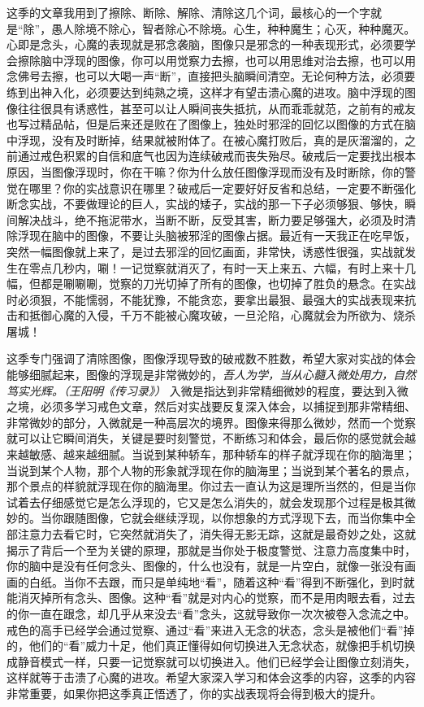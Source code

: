这季的文章我用到了擦除、断除、解除、清除这几个词，最核心的一个字就是“除”，愚人除境不除心，智者除心不除境。心生，种种魔生；心灭，种种魔灭。心即是念头，心魔的表现就是邪念袭脑，图像只是邪念的一种表现形式，必须要学会擦除脑中浮现的图像，你可以用觉察力去擦，也可以用思维对治去擦，也可以用念佛号去擦，也可以大喝一声“断”，直接把头脑瞬间清空。无论何种方法，必须要练到出神入化，必须要达到纯熟之境，这样才有望击溃心魔的进攻。脑中浮现的图像往往很具有诱惑性，甚至可以让人瞬间丧失抵抗，从而乖乖就范，之前有的戒友也写过精品帖，但是后来还是败在了图像上，独处时邪淫的回忆以图像的方式在脑中浮现，没有及时断掉，结果就被附体了。在被心魔打败后，真的是灰溜溜的，之前通过戒色积累的自信和底气也因为连续破戒而丧失殆尽。破戒后一定要找出根本原因，当图像浮现时，你在干嘛？你为什么放任图像浮现而没有及时断除，你的警觉在哪里？你的实战意识在哪里？破戒后一定要好好反省和总结，一定要不断强化断念实战，不要做理论的巨人，实战的矮子，实战的那一下子必须够狠、够快，瞬间解决战斗，绝不拖泥带水，当断不断，反受其害，断力要足够强大，必须及时清除浮现在脑中的图像，不要让头脑被邪淫的图像占据。最近有一天我正在吃早饭，突然一幅图像就上来了，是过去邪淫的回忆画面，非常快，诱惑性很强，实战就发生在零点几秒内，唰！一记觉察就消灭了，有时一天上来五、六幅，有时上来十几幅，但都是唰唰唰，觉察的刀光切掉了所有的图像，也切掉了胜负的悬念。在实战时必须狠，不能懦弱，不能犹豫，不能贪恋，要拿出最狠、最强大的实战表现来抗击和抵御心魔的入侵，千万不能被心魔攻破，一旦沦陷，心魔就会为所欲为、烧杀屠城！

这季专门强调了清除图像，图像浮现导致的破戒数不胜数，希望大家对实战的体会能够细腻起来，图像的浮现是非常微妙的，\textit{吾人为学，当从心髓入微处用力，自然笃实光辉。（王阳明《传习录》）} 入微是指达到非常精细微妙的程度，要达到入微之境，必须多学习戒色文章，然后对实战要反复深入体会，以捕捉到那非常精细、非常微妙的部分，入微就是一种高层次的境界。图像来得那么微妙，然而一个觉察就可以让它瞬间消失，关键是要时刻警觉，不断练习和体会，最后你的感觉就会越来越敏感、越来越细腻。当说到某种轿车，那种轿车的样子就浮现在你的脑海里；当说到某个人物，那个人物的形象就浮现在你的脑海里；当说到某个著名的景点，那个景点的样貌就浮现在你的脑海里。你过去一直认为这是理所当然的，但是当你试着去仔细感觉它是怎么浮现的，它又是怎么消失的，就会发现那个过程是极其微妙的。当你跟随图像，它就会继续浮现，以你想象的方式浮现下去，而当你集中全部注意力去看它时，它突然就消失了，消失得无影无踪，这就是最奇妙之处，这就揭示了背后一个至为关键的原理，那就是当你处于极度警觉、注意力高度集中时，你的脑中是没有任何念头、图像的，什么也没有，就是一片空白，就像一张没有画画的白纸。当你不去跟，而只是单纯地“看”，随着这种“看”得到不断强化，到时就能消灭掉所有念头、图像。这种“看”就是对内心的觉察，而不是用肉眼去看，过去的你一直在跟念，却几乎从来没去“看”念头，这就导致你一次次被卷入念流之中。戒色的高手已经学会通过觉察、通过“看”来进入无念的状态，念头是被他们“看”掉的，他们的“看”威力十足，他们真正懂得如何切换进入无念状态，就像把手机切换成静音模式一样，只要一记觉察就可以切换进入。他们已经学会让图像立刻消失，这样就等于击溃了心魔的进攻。希望大家深入学习和体会这季的内容，这季的内容非常重要，如果你把这季真正悟透了，你的实战表现将会得到极大的提升。

